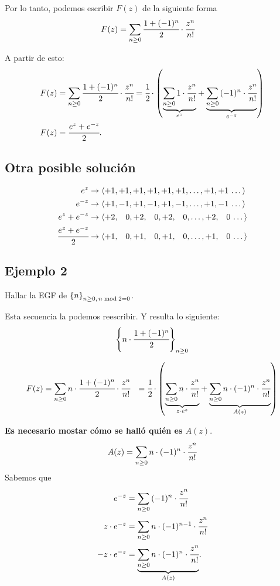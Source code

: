 Por lo tanto, podemos escribir $F(z)$ de la siguiente forma
\begin{align*}
F(z)&=\sum_{n\geq0}{\cfrac{1+(-1)^n}{2}\cdot\cfrac{z^{n}}{n!}}
\end{align*}

A partir de esto:
\begin{align*}
F(z)&=\sum_{n\geq0}{\cfrac{1+(-1)^n}{2}\cdot\cfrac{z^{n}}{n!}}=\cfrac{1}{2}\cdot\left(\underset{e^z}{\underbrace{\sum_{n\geq0}{1\cdot\cfrac{z^{n}}{n!}}}}+\underset{e^{-z}}{\underbrace{\sum_{n\geq0}{(-1)^n\cdot\cfrac{z^{n}}{n!}}}}\right)\\
F(z)&=\cfrac{e^z+e^{-z}}{2}.
\end{align*}

\subsection{Otra posible solución}
\begin{align*}
e^z&\rightarrow \langle+1,+1,+1,+1,+1,+1,\dots,+1,+1\,\dots\rangle\\
e^{-z}
	&\rightarrow \langle+1,-1,+1,-1,+1,-1,\dots,+1,-1\,\dots\rangle\\
e^z+e^{-z}&\rightarrow\langle+2,\,\,\,\,\,0,+2,\,\,\,\,\,0,+2,\,\,\,\,\,0,\dots,+2,\,\,\,\,\,0\,\dots\rangle\\
\cfrac{e^z+e^{-z}}{2}&\rightarrow\langle+1,\,\,\,\,\,0,+1,\,\,\,\,\,0,+1,\,\,\,\,\,0,\dots,+1,\,\,\,\,\,0\,\dots\rangle\\
\end{align*}

\subsection{Ejemplo 2}

Hallar la EGF de $\left\{n\right\}_{n\geq0,\,n\bmod2=0}$.

Esta secuencia la podemos reescribir. Y resulta lo siguiente:
$$\left\{n\cdot\cfrac{1+(-1)^n}{2}\right\}_{n\geq0}$$

\begin{align*}
F(z)&=\sum_{n\geq0}{n\cdot\cfrac{1+(-1)^n}{2}\cdot\cfrac{z^{n}}{n!}}&=\cfrac{1}{2}\cdot\left(\underset{z\cdot e^z}{\underbrace{\sum_{n\geq0}{n\cdot\cfrac{z^{n}}{n!}}}}+\underset{A(z)}{\underbrace{\sum_{n\geq0}{n\cdot(-1)^n\cdot\cfrac{z^{n}}{n!}}}}\right)
\end{align*}

\textbf{Es necesario mostar cómo se halló quién es $A(z).$}
\begin{align*}
A(z)={\sum_{n\geq0}{n\cdot(-1)^n\cdot\cfrac{z^{n}}{n!}}}
\end{align*}
Sabemos que 
\begin{align*}
e^{-z}&=\sum_{n\geq0}{(-1)^n\cdot\cfrac{z^{n}}{n!}}\\
z\cdot e^{-z}&=\sum_{n\geq0}{n\cdot (-1)^{n-1}\cdot\cfrac{z^{n}}{n!}}\\
-z\cdot e^{-z}&=\underset{A(z)}{\underbrace{\sum_{n\geq0}{n\cdot (-1)^{n}\cdot\cfrac{z^{n}}{n!}}}}.
\end{align*}

